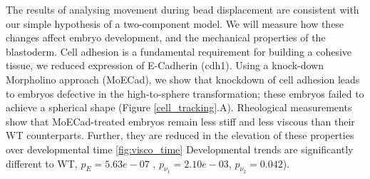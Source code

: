 The results of analysing %
movement during bead displacement are consistent with our simple hypothesis of a two-component model.
We will measure how these changes affect embryo development, %
and the mechanical properties of the blastoderm.
Cell adhesion is a fundamental requirement for building a cohesive tissue, we reduced expression of E-Cadherin (cdh1).
Using a knock-down Morpholino approach (MoECad), we show that knockdown of cell adhesion leads to embryos defective in the high-to-sphere transformation; these embryos failed to achieve a spherical shape (Figure \ref{cell_tracking}.A).
Rheological measurements show that MoECad-treated embryos remain less stiff and less viscous than their WT counterparts.
Further, they are reduced in the elevation of these properties over developmental time \ref{fig:visco_time}
Developmental trends are significantly different to WT, $p_E = 5.63e-07$ , $p_{\nu_1} = 2.10e-03$, $p_{\nu_2} =0.042$).


